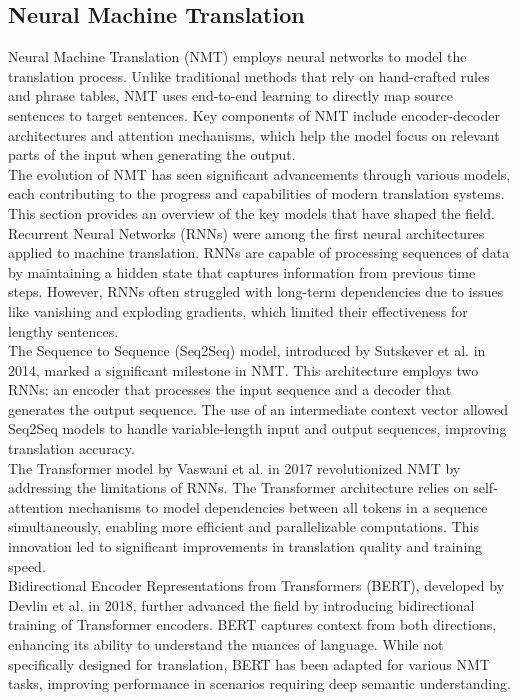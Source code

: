 \documentclass[PhD]{PHlab-thesis}
\begin{document}
\subsection{Neural Machine Translation}
Neural Machine Translation (NMT) employs neural networks to model the translation process. Unlike traditional methods that rely on hand-crafted rules and phrase tables, NMT uses end-to-end learning to directly map source sentences to target sentences.\cite{sutskever2014sequence} Key components of NMT include encoder-decoder architectures and attention mechanisms,\cite{vaswani2017attention} which help the model focus on relevant parts of the input when generating the output.\\
	The evolution of NMT has seen significant advancements through various models, each contributing to the progress and capabilities of modern translation systems. This section provides an overview of the key models that have shaped the field.\\
Recurrent Neural Networks (RNNs) were among the first neural architectures applied to machine translation. RNNs are capable of processing sequences of data by maintaining a hidden state that captures information from previous time steps. However, RNNs often struggled with long-term dependencies due to issues like vanishing and exploding gradients, which limited their effectiveness for lengthy sentences.\\
	The Sequence to Sequence (Seq2Seq) model\cite{sutskever2014sequence}, introduced by Sutskever et al. in 2014, marked a significant milestone in NMT. This architecture employs two RNNs: an encoder that processes the input sequence and a decoder that generates the output sequence. The use of an intermediate context vector allowed Seq2Seq models to handle variable-length input and output sequences, improving translation accuracy.\\
The Transformer model by Vaswani et al\cite{vaswani2017attention}. in 2017 revolutionized NMT by addressing the limitations of RNNs. The Transformer architecture relies on self-attention mechanisms to model dependencies between all tokens in a sequence simultaneously, enabling more efficient and parallelizable computations. This innovation led to significant improvements in translation quality and training speed.\\
	Bidirectional Encoder Representations from Transformers (BERT)\cite{devlin2018bert}, developed by Devlin et al. in 2018, further advanced the field by introducing bidirectional training of Transformer encoders. BERT captures context from both directions, enhancing its ability to understand the nuances of language. While not specifically designed for translation, BERT has been adapted for various NMT tasks, improving performance in scenarios requiring deep semantic understanding.\\
\end{document}
